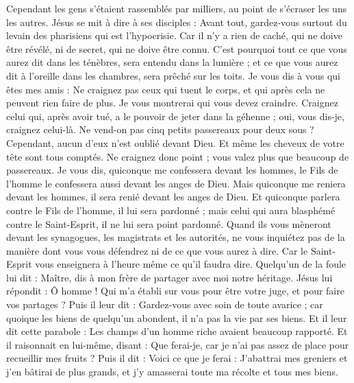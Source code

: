 \begin{multicols}{2}
\VerseOne{}Cependant les gens s'étaient rassemblés par milliers, au point de s'écraser les uns les autres. Jésus se mit à dire à ses disciples : Avant tout, gardez-vous surtout du levain des pharisiens qui est l'hypocrisie.
Car il n'y a rien de caché, qui ne doive être révélé, ni de secret, qui ne doive être connu.
C'est pourquoi tout ce que vous aurez dit dans les ténèbres, sera entendu dans la lumière ; et ce que vous aurez dit à l'oreille dans les chambres, sera prêché sur les toits.
Je vous dis à vous qui êtes mes amis : Ne craignez pas ceux qui tuent le corps, et qui après cela ne peuvent rien faire de plus.
Je vous montrerai qui vous devez craindre. Craignez celui qui, après avoir tué, a le pouvoir de jeter dans la géhenne ; oui, vous dis-je, craignez celui-là.
Ne vend-on pas cinq petits passereaux pour deux sous ? Cependant, aucun d'eux n'est oublié devant Dieu.
Et même les cheveux de votre tête sont tous comptés. Ne craignez donc point ; vous valez plus que beaucoup de passereaux.
Je vous dis, quiconque me confessera devant les hommes, le Fils de l'homme le confessera aussi devant les anges de Dieu.
Mais quiconque me reniera devant les hommes, il sera renié devant les anges de Dieu.
Et quiconque parlera contre le Fils de l'homme, il lui sera pardonné ; mais celui qui aura blasphémé contre le Saint-Esprit, il ne lui sera point pardonné.
Quand ils vous mèneront devant les synagogues, les magistrats et les autorités, ne vous inquiétez pas de la manière dont vous vous défendrez ni de ce que vous aurez à dire.
Car le Saint-Esprit vous enseignera à l'heure même ce qu'il faudra dire.
Quelqu'un de la foule lui dit : Maître, dis à mon frère de partager avec moi notre héritage.
Jésus lui répondit : Ô homme ! Qui m'a établi sur vous pour être votre juge, et pour faire vos partages ?
Puis il leur dit : Gardez-vous avec soin de toute avarice ; car quoique les biens de quelqu'un abondent, il n'a pas la vie par ses biens.
Et il leur dit cette parabole : Les champs d'un homme riche avaient beaucoup rapporté.
Et il raisonnait en lui-même, disant : Que ferai-je, car je n'ai pas assez de place pour recueillir mes fruits ?
Puis il dit : Voici ce que je ferai : J'abattrai mes greniers et j'en bâtirai de plus grands, et j'y amasserai toute ma récolte et tous mes biens.

\end{multicols}
